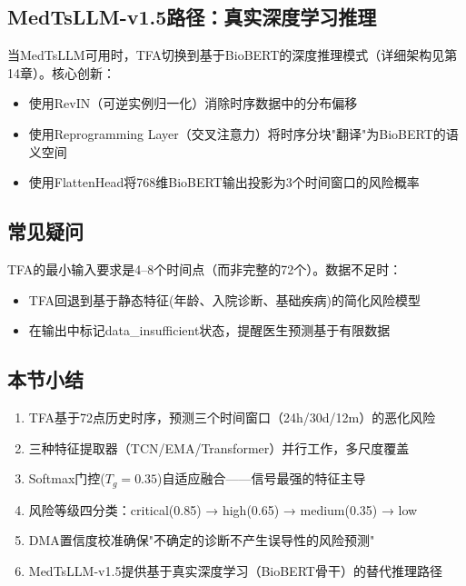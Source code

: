 \documentclass[11pt,a4paper]{ctexart}
\begin{document}
\subsection{MedTsLLM-v1.5路径：真实深度学习推理}

当MedTsLLM可用时，TFA切换到基于BioBERT的深度推理模式（详细架构见第14章）。核心创新：
\begin{itemize}[nosep]
\item 使用RevIN（可逆实例归一化）消除时序数据中的分布偏移
\item 使用Reprogramming Layer（交叉注意力）将时序分块"翻译"为BioBERT的语义空间
\item 使用FlattenHead将768维BioBERT输出投影为3个时间窗口的风险概率
\end{itemize}

\subsection{常见疑问}

\begin{warnbox}
TFA的最小输入要求是4--8个时间点（而非完整的72个）。数据不足时：
\begin{itemize}[nosep]
\item TFA回退到基于静态特征(年龄、入院诊断、基础疾病)的简化风险模型
\item 在输出中标记data\_insufficient状态，提醒医生预测基于有限数据
\end{itemize}
\end{warnbox}

\subsection{本节小结}

\begin{enumerate}[nosep]
\item TFA基于72点历史时序，预测三个时间窗口（24h/30d/12m）的恶化风险
\item 三种特征提取器（TCN/EMA/Transformer）并行工作，多尺度覆盖
\item Softmax门控($T_g=0.35$)自适应融合——信号最强的特征主导
\item 风险等级四分类：critical(0.85) → high(0.65) → medium(0.35) → low
\item DMA置信度校准确保"不确定的诊断不产生误导性的风险预测"
\item MedTsLLM-v1.5提供基于真实深度学习（BioBERT骨干）的替代推理路径
\end{enumerate}
\end{document}
